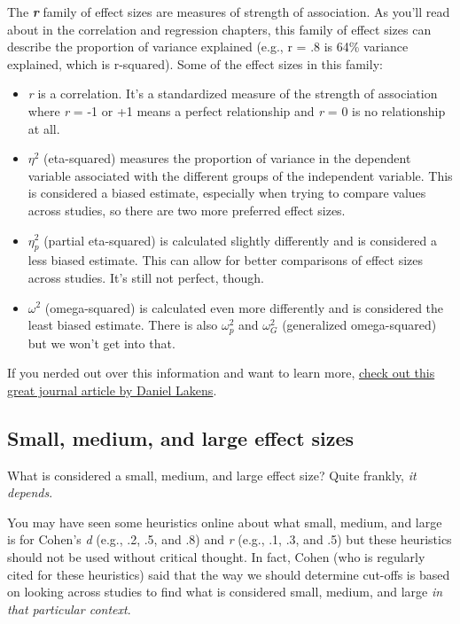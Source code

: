 \documentclass[
]{book}
\begin{document}
The \textbf{\emph{r}} family of effect sizes are measures of strength of association. As you'll read about in the correlation and regression chapters, this family of effect sizes can describe the proportion of variance explained (e.g., r = .8 is 64\% variance explained, which is r-squared). Some of the effect sizes in this family:

\begin{itemize}
\item
  \emph{r} is a correlation. It's a standardized measure of the strength of association where \emph{r} = -1 or +1 means a perfect relationship and \emph{r} = 0 is no relationship at all.
\item
  \(\eta^2\) (eta-squared) measures the proportion of variance in the dependent variable associated with the different groups of the independent variable. This is considered a biased estimate, especially when trying to compare values across studies, so there are two more preferred effect sizes.
\item
  \(\eta^2_p\) (partial eta-squared) is calculated slightly differently and is considered a less biased estimate. This can allow for better comparisons of effect sizes across studies. It's still not perfect, though.
\item
  \(\omega^2\) (omega-squared) is calculated even more differently and is considered the least biased estimate. There is also \(\omega^2_p\) and \(\omega^2_G\) (generalized omega-squared) but we won't get into that.
\end{itemize}

If you nerded out over this information and want to learn more, \href{https://www.frontiersin.org/articles/10.3389/fpsyg.2013.00863/full}{check out this great journal article by Daniel Lakens}.

\hypertarget{small-medium-and-large-effect-sizes}{%
\subsection{Small, medium, and large effect sizes}\label{small-medium-and-large-effect-sizes}}

What is considered a small, medium, and large effect size? Quite frankly, \emph{it depends}.

You may have seen some heuristics online about what small, medium, and large is for Cohen's \emph{d} (e.g., .2, .5, and .8) and \emph{r} (e.g., .1, .3, and .5) but these heuristics should not be used without critical thought. In fact, Cohen (who is regularly cited for these heuristics) said that the way we should determine cut-offs is based on looking across studies to find what is considered small, medium, and large \emph{in that particular context}.
\end{document}
